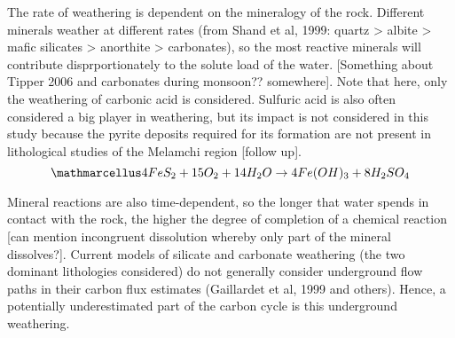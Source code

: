 \begin{tcolorbox}
{\begin{center}
    \end{center}

The rate of weathering is dependent on the mineralogy of the rock. Different minerals weather at different rates (from Shand et al, 1999: quartz > albite > mafic silicates > anorthite > carbonates), so the most reactive minerals will contribute disprportionately to the solute load of the water. [Something about Tipper 2006 and carbonates during monsoon?? somewhere]. Note that here, only the weathering of carbonic acid is considered. Sulfuric acid is also often considered a big player in weathering, but its impact is not considered in this study because the pyrite deposits required for its formation are not present in lithological studies of the Melamchi region [follow up].
\[
\ttmath{4FeS_2 + 15O_2 + 14H_2O \rightarrow 4Fe(OH)_3 + 8H_2SO_4}
\] 

Mineral reactions are also time-dependent, so the longer that water spends in contact with the rock, the higher the degree of completion of a chemical reaction [can mention incongruent dissolution whereby only part of the mineral dissolves?]. Current models of silicate and carbonate weathering (the two dominant lithologies considered) do not generally consider underground flow paths in their carbon flux estimates (Gaillardet et al, 1999 and others). Hence, a potentially underestimated part of the carbon cycle is this underground weathering.

}
\end{tcolorbox}


\newpage








